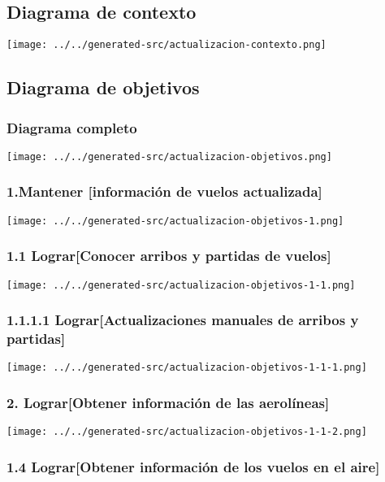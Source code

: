 \subsection{Diagrama de contexto}

\texttt{[image: ../../generated-src/actualizacion-contexto.png]}

\subsection{Diagrama de objetivos}

\subsubsection{Diagrama completo}

\texttt{[image: ../../generated-src/actualizacion-objetivos.png]}

\subsubsection{1.Mantener [información de vuelos actualizada]}

\texttt{[image: ../../generated-src/actualizacion-objetivos-1.png]}

\subsubsection{1.1 Lograr[Conocer arribos y partidas de vuelos]}

\texttt{[image: ../../generated-src/actualizacion-objetivos-1-1.png]}

\subsubsection{1.1.1.1 Lograr[Actualizaciones manuales de arribos y partidas]}

\texttt{[image: ../../generated-src/actualizacion-objetivos-1-1-1.png]}

\subsubsection{2. Lograr[Obtener información de las aerolíneas]}

\texttt{[image: ../../generated-src/actualizacion-objetivos-1-1-2.png]}

\subsubsection{1.4 Lograr[Obtener información de los vuelos en el aire]}

